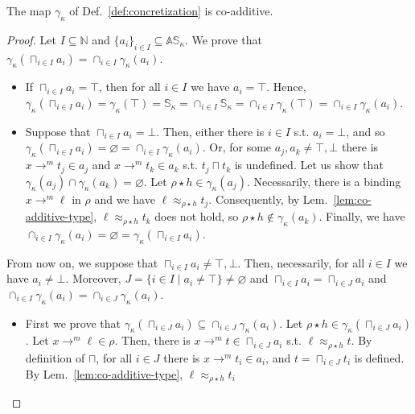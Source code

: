 \begin{lemma}\label{lem:co-additive}
  The map $\gamma_\kappa$ of Def.~\ref{def:concretization} is co-additive.
\end{lemma}
\begin{proof}
  Let $I\subseteq\mathbb{N}$ and $\{a_i\}_{i\in I}\subseteq\mathbb{AS}_\kappa$.
  We prove that $\gamma_\kappa(\sqcap_{i\in I}a_i)=\cap_{i\in I}\gamma_\kappa(a_i)$.
  \begin{itemize}
    \item If $\sqcap_{i\in I}a_i=\top$, then for all $i\in I$ we have $a_i=\top$.
    Hence, $\gamma_\kappa(\sqcap_{i\in I}a_i) =
    \gamma_\kappa(\top) =
    \mathbb{S}_\kappa =
    \cap_{i\in I}\mathbb{S}_\kappa =
    \cap_{i\in I}\gamma_\kappa(\top) =
    \cap_{i\in I}\gamma_\kappa(a_i)$.
    \item Suppose that $\sqcap_{i\in I}a_i=\bot$. Then, either there is $i\in I$ s.t.
    $a_i=\bot$, and so $\gamma_\kappa(\sqcap_{i\in I}a_i) = \varnothing =
    \cap_{i\in I}\gamma_\kappa(a_i)$. Or, for some $a_j,a_k\not=\top,\bot$
    there is $x\to^m t_j\in a_j$ and $x\to^m t_k\in a_k$ s.t.
    $t_j\sqcap t_k$ is undefined. Let us show that
    $\gamma_\kappa(a_j)\cap\gamma_\kappa(a_k)=\varnothing$.
    Let $\rho\star h\in\gamma_\kappa(a_j)$.
    Necessarily, there is a binding $x\to^m\ell$ in $\rho$ and
    we have $\ell\approx_{\rho\star h}t_j$.
    Consequently, by Lem.~\ref{lem:co-additive-type},
    $\ell\approx_{\rho\star h}t_k$ does not hold, so
    $\rho\star h\not\in\gamma_\kappa(a_k)$.
    Finally, we have $\cap_{i\in I}\gamma_\kappa(a_i) = \varnothing =
    \gamma_\kappa(\sqcap_{i\in I}a_i)$.
  \end{itemize}
  From now on, we suppose that $\sqcap_{i\in I}a_i\not=\top,\bot$.
  Then, necessarily, for all $i\in I$ we have $a_i\not=\bot$.
  Moreover, $J=\{i\in I\mid a_i\neq\top\}\not=\varnothing$ and
  $\sqcap_{i\in I}a_i = \sqcap_{i\in J}a_i$ and
  $\cap_{i\in I}\gamma_\kappa(a_i)=\cap_{i\in J}\gamma_\kappa(a_i)$.
  \begin{itemize}
    \item First we prove that
    $\gamma_\kappa(\sqcap_{i\in J}a_i)\subseteq\cap_{i\in J}\gamma_\kappa(a_i)$.
    Let $\rho\star h\in\gamma_\kappa(\sqcap_{i\in J}a_i)$.
    Let $x\to^m\ell\in\rho$. Then, there is $x\to^m t\in \sqcap_{i\in J}a_i$ s.t.
    $\ell\approx_{\rho\star h}t$. By definition of $\sqcap$, for all $i\in J$
    there is $x\to^m t_i\in a_i$, and $t=\sqcap_{i\in J}t_i$ is defined.
    By Lem.~\ref{lem:co-additive-type}, $\ell\approx_{\rho\star h}t_i$

\end{itemize}
\end{proof}
